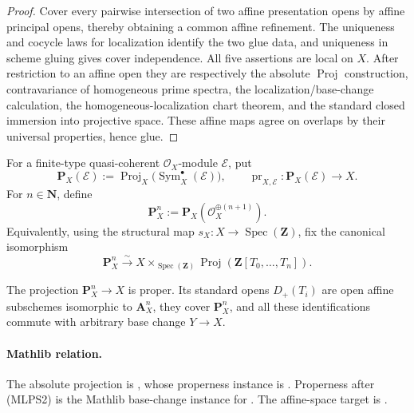 \begin{proof}
  Cover every pairwise intersection of two affine presentation opens by
  affine principal opens, thereby obtaining a common affine refinement.
  The uniqueness and cocycle laws for localization identify the two glue
  data, and uniqueness in scheme gluing gives cover independence.  All five
  assertions are local on $X$.  After restriction to an affine open they are
  respectively the absolute $\operatorname{Proj}$ construction,
  contravariance of homogeneous prime spectra, the localization/base-change
  calculation, the homogeneous-localization chart theorem, and the standard
  closed immersion into projective space.  These affine maps agree on
  overlaps by their universal properties, hence glue.
\end{proof}

\begin{definition}
  \label{def:nagata-relative-projective-space}

  For a finite-type quasi-coherent $\mathcal O_X$-module $\mathcal E$, put
  \[
    \mathbf P_X(\mathcal E)
      :=\operatorname{Proj}_X
        \bigl(\operatorname{Sym}_X^\bullet(\mathcal E)\bigr),
    \qquad
    \operatorname{pr}_{X,\mathcal E}\colon
      \mathbf P_X(\mathcal E)\longrightarrow X.                  \tag{MLPS0}
  \]
  For $n\in\mathbf N$, define
  \[
    \mathbf P_X^n:=\mathbf P_X(\mathcal O_X^{\oplus(n+1)}).
                                                                    \tag{MLPS1}
  \]
  Equivalently, using the structural map
  $s_X\colon X\to\operatorname{Spec}(\mathbf Z)$, fix the canonical
  isomorphism
  \[
    \mathbf P_X^n\xrightarrow{\sim}
      X\times_{\operatorname{Spec}(\mathbf Z)}
        \operatorname{Proj}(\mathbf Z[T_0,\ldots,T_n]).           \tag{MLPS2}
  \]
\end{definition}

\begin{lemma}
  \label{lemma:nagata-relative-projective-space}

  The projection $\mathbf P_X^n\to X$ is proper.  Its standard opens
  $D_+(T_i)$ are open affine subschemes isomorphic to $\mathbf A_X^n$, they
  cover $\mathbf P_X^n$, and all these identifications commute with arbitrary
  base change $Y\to X$.

  \paragraph{Mathlib relation.}
  The absolute projection is
  \texttt{}, whose properness
  instance is
  \texttt{}.
  Properness after (MLPS2) is the Mathlib base-change instance for
  \texttt{}.  The affine-space target
  is \texttt{}.
\end{lemma}

